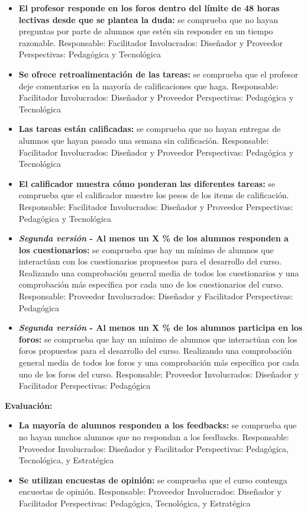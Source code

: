 \begin{itemize}
	\item
	\textbf{El profesor responde en los foros dentro del límite de 48
		horas lectivas desde que se plantea la duda:} se comprueba que no
	hayan preguntas por parte de alumnos que estén sin responder en un
	tiempo razonable. {Responsable:} Facilitador
	{Involucrados:} Diseñador y Proveedor {Perspectivas:}
	Pedagógica y Tecnológica
	\item
	\textbf{Se ofrece retroalimentación de las tareas:} se comprueba que
	el profesor deje comentarios en la mayoría de calificaciones que haga.
	{Responsable:} Facilitador {Involucrados:} Diseñador y
	Proveedor {Perspectivas:} Pedagógica y Tecnológica
	\item
	\textbf{Las tareas están calificadas:} se comprueba que no hayan
	entregas de alumnos que hayan pasado una semana sin calificación.
	{Responsable:} Facilitador {Involucrados:} Diseñador y
	Proveedor {Perspectivas:} Pedagógica y Tecnológica
	\item
	\textbf{El calificador muestra cómo ponderan las diferentes tareas:}
	se comprueba que el calificador muestre los pesos de los items de
	calificación. {Responsable:} Facilitador {Involucrados:}
	Diseñador y Proveedor {Perspectivas:} Pedagógica y Tecnológica
	\item
	\textbf{\textit{Segunda versión} - Al menos un X \% de los alumnos responden a los cuestionarios:}
	se comprueba que hay un mínimo de alumnos que interactúan con los cuestionarios propuestos para el desarrollo del curso. Realizando una comprobación general media de todos los cuestionarios y una comprobación más específica por cada uno de los cuestionarios del curso. {Responsable:} Proveedor {Involucrados:}
	Diseñador y Facilitador {Perspectivas:} Pedagógica
	\item
	\textbf{\textit{Segunda versión} - Al menos un X \% de los alumnos participa en los foros:}
	se comprueba que hay un mínimo de alumnos que interactúan con los foros propuestos para el desarrollo del curso. Realizando una comprobación general media de todos los foros y una comprobación más específica por cada uno de los foros del curso. {Responsable:} Proveedor {Involucrados:}
	Diseñador y Facilitador {Perspectivas:} Pedagógica
\end{itemize}

\textbf{Evaluación:}

\begin{itemize}
	\item
	\textbf{La mayoría de alumnos responden a los feedbacks:} se comprueba
	que no hayan muchos alumnos que no respondan a los feedbacks.
	{Responsable:} Proveedor {Involucrados:} Diseñador y
	Facilitador {Perspectivas:} Pedagógica, Tecnológica, y
	Estratégica
	\item
	\textbf{Se utilizan encuestas de opinión:} se comprueba que el curso
	contenga encuestas de opinión. {Responsable:} Proveedor
	{Involucrados:} Diseñador y Facilitador {Perspectivas:}
	Pedagógica, Tecnológica, y Estratégica
\end{itemize}

